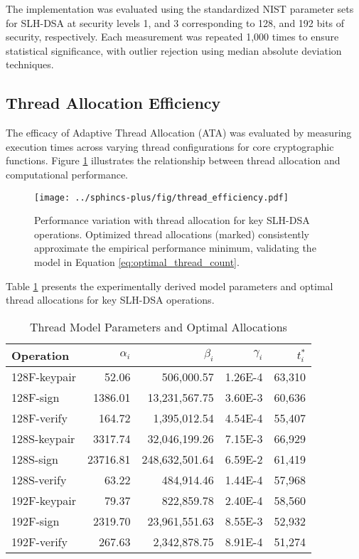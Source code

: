 \documentclass[journal]{IEEEtran}
\begin{document}
The implementation was evaluated using the standardized NIST parameter sets for SLH-DSA at security levels 1, and 3 corresponding to 128, and 192 bits of security, respectively. Each measurement was repeated 1,000 times to ensure statistical significance, with outlier rejection using median absolute deviation techniques.

\subsection{Thread Allocation Efficiency}

The efficacy of Adaptive Thread Allocation (ATA) was evaluated by measuring execution times across varying thread configurations for core cryptographic functions. Figure \ref{fig:thread_efficiency} illustrates the relationship between thread allocation and computational performance.

\begin{figure}[htbp]
  \centering
  \texttt{[image: ../sphincs-plus/fig/thread\_efficiency.pdf]}
  \caption{Performance variation with thread allocation for key SLH-DSA operations. Optimized thread allocations (marked) consistently approximate the empirical performance minimum, validating the model in Equation \ref{eq:optimal_thread_count}.}
  \label{fig:thread_efficiency}
\end{figure}

Table \ref{tab:thread_model_params} presents the experimentally derived model parameters and optimal thread allocations for key SLH-DSA operations.

\begin{table}[h]
  \centering
  \caption{Thread Model Parameters and Optimal Allocations}
  \label{tab:thread_model_params}
  \begin{tabular}{@{}lrrrr@{}}
    \toprule
    \textbf{Operation} & \boldmath$\alpha_i$ & \boldmath$\beta_i$ & \boldmath$\gamma_i$ & \boldmath$t_i^*$ \\
    \midrule
    128F-keypair & 52.06 & 506,000.57 & 1.26E-4 & 63,310 \\
    128F-sign & 1386.01 & 13,231,567.75 & 3.60E-3 & 60,636 \\
    128F-verify & 164.72 & 1,395,012.54 & 4.54E-4 & 55,407 \\
    128S-keypair & 3317.74 & 32,046,199.26 & 7.15E-3 & 66,929 \\
    128S-sign & 23716.81 & 248,632,501.64 & 6.59E-2 & 61,419 \\
    128S-verify & 63.22 & 484,914.46 & 1.44E-4 & 57,968 \\
    192F-keypair & 79.37 & 822,859.78 & 2.40E-4 & 58,560 \\
    192F-sign & 2319.70 & 23,961,551.63 & 8.55E-3 & 52,932 \\
    192F-verify & 267.63 & 2,342,878.75 & 8.91E-4 & 51,274 \\
    \bottomrule
  \end{tabular}
\end{table}
\end{document}
